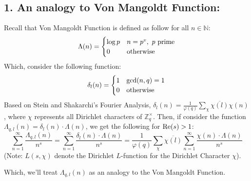 \documentclass{article}
\newcommand{\NN}{\mathbb{N}}
\newcommand{\ZZ}{\mathbb{Z}}
\newcommand{\Real}{\textmd{Re}}
\begin{document}
\subsection*{1. An analogy to Von Mangoldt Function:}
Recall that Von Mangoldt Function is defined as follow for all $n\in \NN$:
\begin{equation}
    \label{eq:10}
    \Lambda(n)=\begin{cases}
        \log p & n=p^v,\ p \textmd{ prime}\\
        0 & \textmd{otherwise}
    \end{cases}
\end{equation}
Which, consider the following function:
\begin{equation}
    \label{eq:11}
    \delta_l(n)= \begin{cases}
        1 & \gcd(n,q)=1\\
        0 & \textmd{otherwise}
    \end{cases}
\end{equation}
Based on Stein and Shakarchi's Fourier Analysis, $\delta_l(n)=\frac{1}{\varphi(q)}\sum_{\chi}\overline{\chi(l)}\chi(n)$, where $\chi$ represents all Dirichlet characters of $\ZZ_q^\times$. Then, if consider the function $\Lambda_{q,l}(n)=\delta_l(n)\cdot\Lambda(n)$, we get the following for $\Real(s)>1$:
\begin{equation}
    \label{eq:12}
    \sum_{n=1}^{\infty}\frac{\Lambda_{q,l}(n)}{n^s}=\sum_{n=1}^{\infty}\frac{\delta_l(n)\cdot\Lambda(n)}{n^s} = \frac{1}{\varphi(q)}\sum_{\chi}\overline{\chi(l)}\sum_{n=1}^{\infty}\frac{\chi(n)\cdot\Lambda(n)}{n^s}
\end{equation}
(Note: $L(s,\chi)$ denote the Dirichlet $L$-function for the Dirichlet Character $\chi$).

Which, we'll treat $\Lambda_{q,l}(n)$ as an analogy to the Von Mangoldt Function.
\end{document}
